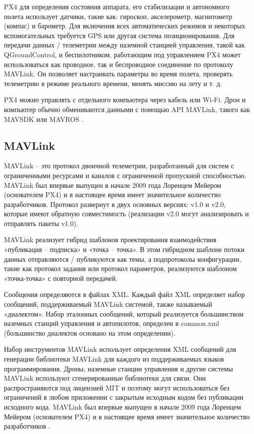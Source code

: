 PX4 для определения состояния аппарата, его стабилизации и автономного полета использует датчики, такие как: гироскоп, акселерометр, магнитометр (компас) и барометр. Для включения всех автоматических режимов и некоторых вспомогательных требуется GPS или другая система позиционирования.
Для передачи данных / телеметрии между наземной станцией управления, такой как Q\-Ground\-Control, и беспилотником, работающим под управлением PX4 может использоваться как проводное, так и беспроводное соединение по протоколу MAVLink. Он позволяет настраивать параметры во время полета, проверять телеметрию в режиме реального времени, менять миссию на лету и т. д.

PX4 можно управлять с отдельного компьютера через кабель или Wi-Fi. Дрон и компьютер обычно обмениваются данными с помощью API MAVLink, такого как MAVSDK или MAVROS \cite{px4}.

\subsection{MAVLink}


MAVLink -- это протокол двоичной телеметрии, разработанный для систем с ограниченными ресурсами и каналов с ограниченной пропускной способностью. MAVLink был впервые выпущен в начале 2009 года Лоренцем Мейером (основателем PX4) и в настоящее время имеет значительное количество разработчиков. Протокол развернут в двух основных версиях: v1.0 и v2.0, которые имеют обратную совместимость (реализации v2.0 могут анализировать и отправлять пакеты v1.0).

MAVLink реализует гибрид шаблонов проектирования взаимодействия «публикация -- подписка» и «точка -- точка». В этом гибридном шаблоне потоки данных отправляются / публикуются как темы, а подпротоколы конфигурации, такие как протокол задания или протокол параметров, реализуются шаблоном «точка-точка» с повторной передачей.

Сообщения определяются в файлах XML. Каждый файл XML определяет набор сообщений, поддерживаемый MAVLink системой, также называемый «диалектом». Набор эталонных сообщений, который реализуется большинством наземных станций управления и автопилотов, определен в common.xml (большинство диалектов основано на этом определении).

Набор инструментов MAVLink использует определения XML сообщений для генерации библиотеки MAVLink для каждого из поддерживаемых языков программирования. Дроны, наземные станции управления и другие системы MAVLink используют сгенерированные библиотеки для связи. Они распространяются под лицензией MIT и поэтому могут использоваться без ограничений в любом приложении с закрытым исходным кодом без публикации исходного кода. MAVLink был впервые выпущен в начале 2009 года Лоренцем Мейером (основателем PX4) и в настоящее время имеет значительное количество разработчиков \cite{px}.

